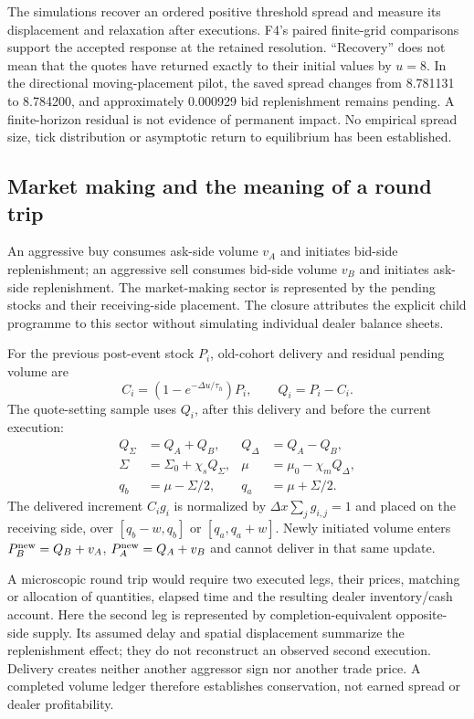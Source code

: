 \documentclass[11pt,a4paper]{article}
\newcommand{\du}{\Delta u}\newcommand{\dx}{\Delta x}\newcommand{\lap}{\delta_x^2}
\begin{document}
The simulations recover an ordered positive threshold spread and measure its displacement and relaxation after executions. F4's paired finite-grid comparisons support the accepted response at the retained resolution. ``Recovery'' does not mean that the quotes have returned exactly to their initial values by $u=8$. In the directional moving-placement pilot, the saved spread changes from 8.781131 to 8.784200, and approximately 0.000929 bid replenishment remains pending. A finite-horizon residual is not evidence of permanent impact. No empirical spread size, tick distribution or asymptotic return to equilibrium has been established.

\subsection{Market making and the meaning of a round trip}
An aggressive buy consumes ask-side volume $v_A$ and initiates bid-side replenishment; an aggressive sell consumes bid-side volume $v_B$ and initiates ask-side replenishment. The market-making sector is represented by the pending stocks and their receiving-side placement. The closure attributes the explicit child programme to this sector without simulating individual dealer balance sheets.

For the previous post-event stock $P_i$, old-cohort delivery and residual pending volume are
\begin{equation}
C_i=(1-e^{-\du/\tau_h})P_i,\qquad Q_i=P_i-C_i.
\end{equation}
The quote-setting sample uses $Q_i$, after this delivery and before the current execution:
\begin{equation}\label{eq:placement}
\begin{aligned}
Q_\Sigma&=Q_A+Q_B,& Q_\Delta&=Q_A-Q_B,\\
\Sigma&=\Sigma_0+\chi_sQ_\Sigma,&\mu&=\mu_0-\chi_mQ_\Delta,\\
q_b&=\mu-\Sigma/2,&q_a&=\mu+\Sigma/2.
\end{aligned}
\end{equation}
The delivered increment $C_i g_i$ is normalized by $\dx\sum_jg_{i,j}=1$ and placed on the receiving side, over $[q_b-w,q_b]$ or $[q_a,q_a+w]$. Newly initiated volume enters $P_B^{\rm new}=Q_B+v_A$, $P_A^{\rm new}=Q_A+v_B$ and cannot deliver in that same update.

A microscopic round trip would require two executed legs, their prices, matching or allocation of quantities, elapsed time and the resulting dealer inventory/cash account. Here the second leg is represented by completion-equivalent opposite-side supply. Its assumed delay and spatial displacement summarize the replenishment effect; they do not reconstruct an observed second execution. Delivery creates neither another aggressor sign nor another trade price. A completed volume ledger therefore establishes conservation, not earned spread or dealer profitability.
\end{document}
